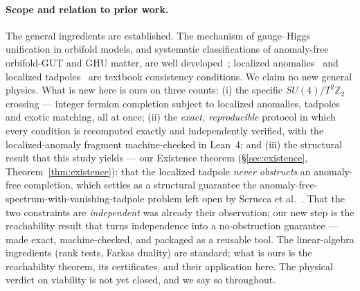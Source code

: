 \documentclass[11pt,a4paper]{article}
\begin{document}
\paragraph{Scope and relation to prior work.} The general ingredients are established.
The mechanism of gauge--Higgs unification in orbifold models, and systematic
classifications of anomaly-free orbifold-GUT and GHU matter, are well
developed~\cite{SSSW,Kawamura,aGUT,SU6GHGUT}; localized anomalies~\cite{ACG,GdVQ,GdV6D} and
localized tadpoles~\cite{BiggioQ} are textbook consistency conditions. We claim no new
general physics. What is new here is ours on three counts: (i) the specific
$SU(4)/T^2\mathbb{Z}_2$ crossing --- integer fermion completion subject to localized
anomalies, tadpoles and exotic matching, all at once; (ii) the \emph{exact, reproducible}
protocol in which every condition is recomputed exactly and independently verified, with
the localized-anomaly fragment machine-checked in Lean~4; and (iii) the structural result
that this study yields --- our Existence theorem (\S\ref{sec:existence},
Theorem~\ref{thm:existence}): that the localized tadpole \emph{never obstructs} an
anomaly-free completion, which settles as a structural guarantee the
anomaly-free-spectrum-with-vanishing-tadpole problem left open by
Scrucca et al.~\cite{SSSW}. That the two constraints are \emph{independent} was already
their observation; our new step is the reachability result that turns independence into a
no-obstruction guarantee --- made exact, machine-checked, and packaged as a reusable tool.
The linear-algebra ingredients (rank tests, Farkas duality) are standard; what is ours is
the reachability theorem, its certificates, and their application here. The physical
verdict on viability is not yet closed, and we say so throughout.
\end{document}
